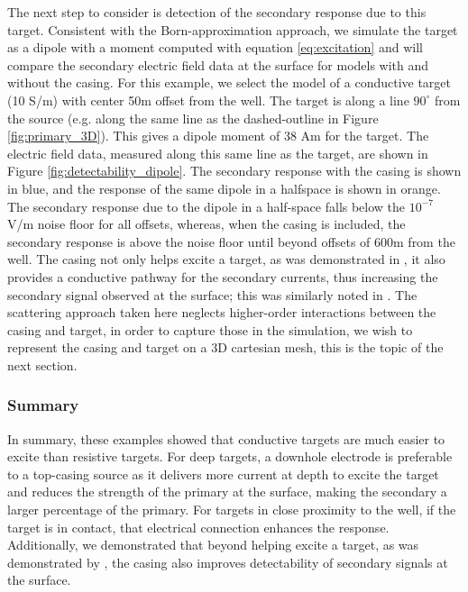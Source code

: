 




The next step to consider is detection of the secondary response due to this target. Consistent with the Born-approximation approach, we simulate the target as a dipole with a moment computed with equation \ref{eq:excitation} and will compare the secondary electric field data at the surface for models with and without the casing. For this example, we select the model of a conductive target (10 S/m) with center 50m offset from the well. The target is along a line $90^\circ$ from the source (e.g. along the same line as the dashed-outline in Figure \ref{fig:primary_3D}). This gives a dipole moment of 38 Am for the target. The  electric field data, measured along this same line as the target, are shown in Figure \ref{fig:detectability_dipole}. The secondary response with the casing is shown in blue, and the response of the same dipole in a halfspace is shown in orange. The secondary response due to the dipole in a half-space falls below the $10^{-7}$ V/m noise floor for all offsets, whereas, when the casing is included, the secondary response is above the noise floor until beyond offsets of 600m from the well. The casing not only helps excite a target, as was demonstrated in \cite{Schenkel1994}, it also provides a conductive pathway for the secondary currents, thus increasing the secondary signal observed at the surface; this was similarly noted in \cite{Yang2016}. The scattering approach taken here neglects higher-order interactions between the casing and target, in order to capture those in the simulation, we wish to represent the casing and target on a 3D cartesian mesh, this is the topic of the next section.





\subsubsection{Summary}
In summary, these examples showed that conductive targets are much easier to excite than resistive targets. For deep targets, a downhole electrode is preferable to a top-casing source as it delivers more current at depth to excite the target and reduces the strength of the primary at the surface, making the secondary a larger percentage of the primary. For targets in close proximity to the well, if the target is in contact, that electrical connection enhances the response. Additionally, we demonstrated that beyond helping excite a target, as was demonstrated by \cite{Schenkel1994}, the casing also improves detectability of secondary signals at the surface.

